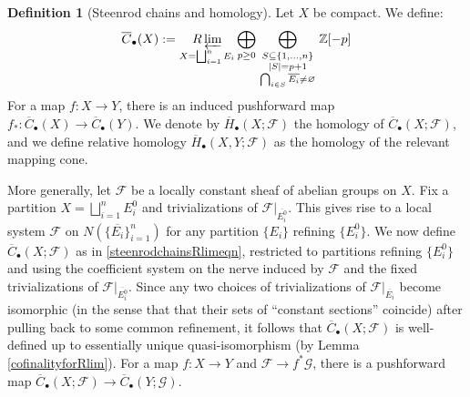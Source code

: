 \documentclass[12pt]{article}
\theoremstyle{definition}
\newtheorem{definition}[theorem]{Definition}
\theoremstyle{remark}
\numberwithin{equation}{subsection}
\newcommand{\F}{\mathcal F}
\newcommand{\G}{\mathcal G}
\newcommand{\ZZ}{\mathbb Z}
\newcommand{\sC}{\overline C}
\newcommand{\sH}{\overline H}
\newcommand{\Rlim}{\mathop{R\varprojlim}}
\begin{document}
\begin{definition}[Steenrod chains and homology]\label{steenrodhomdef}
Let $X$ be compact.  We define:
\begin{equation}\label{steenrodchainsRlimeqn}
\sC_\bullet(X):=\Rlim_{X=\bigsqcup_{i=1}^nE_i}\bigoplus_{p\geq 0}\bigoplus_{\begin{smallmatrix}S\subseteq\{1,\ldots,n\}\cr\left|S\right|=p+1\cr\bigcap_{i\in S}\overline{E_i}\ne\varnothing\end{smallmatrix}}\ZZ[-p]
\end{equation}
For a map $f:X\to Y$, there is an induced pushforward map $f_\ast:\sC_\bullet(X)\to\sC_\bullet(Y)$.  We denote by $\sH_\bullet(X;\F)$ the homology of $\sC_\bullet(X;\F)$, and we define relative homology $\sH_\bullet(X,Y;\F)$ as the homology of the relevant mapping cone.

More generally, let $\F$ be a locally constant sheaf of abelian groups on $X$.  Fix a partition $X=\bigsqcup_{i=1}^nE_i^0$ and trivializations of $\F|_{\overline{E_i^0}}$.  This gives rise to a local system $\F$ on $N(\{\overline{E_i}\}_{i=1}^n)$ for any partition $\{E_i\}$ refining $\{E_i^0\}$.  We now define $\sC_\bullet(X;\F)$ as in \eqref{steenrodchainsRlimeqn}, restricted to partitions refining $\{E_i^0\}$ and using the coefficient system on the nerve induced by $\F$ and the fixed trivializations of $\F|_{\overline{E_i^0}}$.  Since any two choices of trivializations of $\F|_{\overline{E_i}}$ become isomorphic (in the sense that that their sets of ``constant sections'' coincide) after pulling back to some common refinement, it follows that $\sC_\bullet(X;\F)$ is well-defined up to essentially unique quasi-isomorphism (by Lemma \ref{cofinalityforRlim}).  For a map $f:X\to Y$ and $\F\to f^\ast\G$, there is a pushforward map $\sC_\bullet(X;\F)\to\sC_\bullet(Y;\G)$.
\end{definition}
\end{document}
